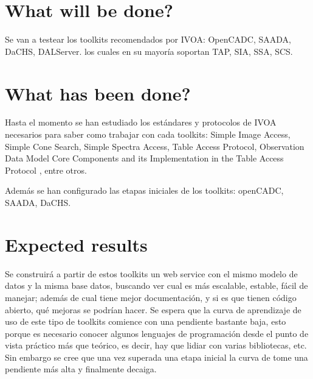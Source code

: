 \section{What will be done?}

Se van a testear los toolkits recomendados por IVOA: OpenCADC, SAADA, DaCHS,
DALServer. los cuales en su mayoría soportan TAP, SIA, SSA, SCS.

\section{What has been done?}

Hasta el momento se han estudiado los estándares y protocolos de IVOA
necesarios para saber como trabajar con cada toolkits: Simple Image Access,
Simple Cone Search, Simple Spectra Access, Table Access Protocol, Observation
Data Model Core Components and its Implementation in the Table Access Protocol
\cite{obscore}, entre otros.

Además se han configurado las etapas iniciales de los toolkits: openCADC,
SAADA, DaCHS.

\section{Expected results}

Se construirá a partir de estos toolkits un web service con el mismo modelo de
datos y la misma base datos, buscando ver cual es más escalable, estable, fácil
de manejar; además de cual tiene mejor documentación, y si es que tienen código
abierto, qué mejoras se podrían hacer. Se espera que la curva de aprendizaje de
uso de este tipo de toolkits comience con una pendiente bastante baja, esto
porque es necesario conocer algunos lenguajes de programación desde el punto de
vista práctico más que teórico, es decir, hay que lidiar con varias
bibliotecas, etc. Sin embargo se cree que una vez superada una etapa inicial la
curva de tome una pendiente más alta y finalmente decaiga.
